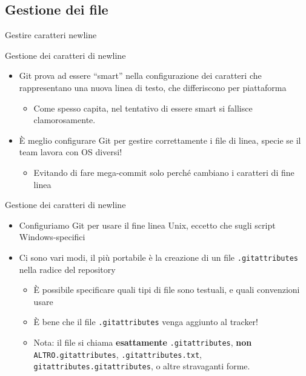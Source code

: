 \documentclass[xcolor=dvipsnames,presentation]{beamer}
\begin{document}
\subsection{Gestione dei file}

\begin{frame}{Gestire caratteri newline}
    \begin{block}{Gestione dei caratteri di newline}
        \begin{itemize}
            \item Git prova ad essere ``smart'' nella configurazione dei caratteri che rappresentano una nuova linea di testo, che differiscono per piattaforma
            \begin{itemize}
                \item Come spesso capita, nel tentativo di essere smart si fallisce clamorosamente.
            \end{itemize}
            \item È meglio configurare Git per gestire correttamente i file di linea, specie se il team lavora con OS diversi!
            \begin{itemize}
                \item Evitando di fare mega-commit solo perché cambiano i caratteri di fine linea
            \end{itemize}
        \end{itemize}
    \end{block}
    \begin{block}{Gestione dei caratteri di newline}
        \begin{itemize}
            \item Configuriamo Git per usare il fine linea Unix, eccetto che sugli script Windows-specifici
            \item Ci sono vari modi, il più portabile è la creazione di un file \texttt{.gitattributes} nella radice del repository
            \begin{itemize}
                \item È possibile specificare quali tipi di file sono testuali, e quali convenzioni usare
                \item È bene che il file \texttt{.gitattributes} venga aggiunto al tracker!
                \item Nota: il file si chiama \textbf{esattamente} \texttt{.gitattributes},
                \textbf{non} \texttt{ALTRO.gitattributes}, \texttt{.gitattributes.txt}, \texttt{gitattributes.gitattributes}, o altre stravaganti forme.

\end{itemize}
\end{itemize}
\end{block}
\end{frame}
\end{document}
